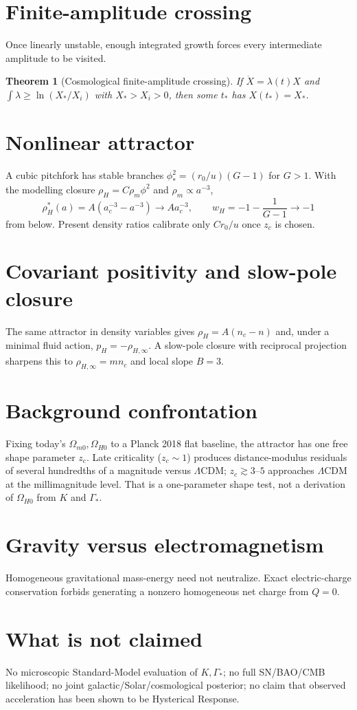 \documentclass[11pt]{article}
\newtheorem{theorem}{Theorem}[section]
\theoremstyle{definition}
\theoremstyle{remark}
\begin{document}
\section{Finite-amplitude crossing}
Once linearly unstable, enough integrated growth forces every intermediate amplitude to be visited.

\begin{theorem}[Cosmological finite-amplitude crossing]
If $\dot X=\lambda(t)X$ and $\int\lambda\ge\ln(X_*/X_i)$ with $X_*>X_i>0$, then some $t_*$ has $X(t_*)=X_*$.
\end{theorem}

\section{Nonlinear attractor}
A cubic pitchfork has stable branches $\phi_*^2=(r_0/u)(G-1)$ for $G>1$.
With the modelling closure $\rho_H=C\rho_m\phi^2$ and $\rho_m\propto a^{-3}$,
\[
\rho_H^*(a)=A(a_c^{-3}-a^{-3})\longrightarrow A a_c^{-3},
\qquad
w_H=-1-\frac{1}{G-1}\to-1
\]
from below.
Present density ratios calibrate only $C r_0/u$ once $z_c$ is chosen.

\section{Covariant positivity and slow-pole closure}
The same attractor in density variables gives $\rho_H=A(n_c-n)$ and, under a minimal fluid action, $p_H=-\rho_{H,\infty}$.
A slow-pole closure with reciprocal projection sharpens this to $\rho_{H,\infty}=m n_c$ and local slope $B=3$.

\section{Background confrontation}
Fixing today's $\Omega_{m0},\Omega_{H0}$ to a Planck 2018 flat baseline, the attractor has one free shape parameter $z_c$.
Late criticality ($z_c\sim1$) produces distance-modulus residuals of several hundredths of a magnitude versus $\Lambda$CDM; $z_c\gtrsim3$--$5$ approaches $\Lambda$CDM at the millimagnitude level.
That is a one-parameter shape test, not a derivation of $\Omega_{H0}$ from $K$ and $\Gamma_*$.

\section{Gravity versus electromagnetism}
Homogeneous gravitational mass-energy need not neutralize.
Exact electric-charge conservation forbids generating a nonzero homogeneous net charge from $Q=0$.

\section{What is not claimed}
No microscopic Standard-Model evaluation of $K,\Gamma_*$; no full SN/BAO/CMB likelihood; no joint galactic/Solar/cosmological posterior; no claim that observed acceleration has been shown to be Hysterical Response.
\end{document}
